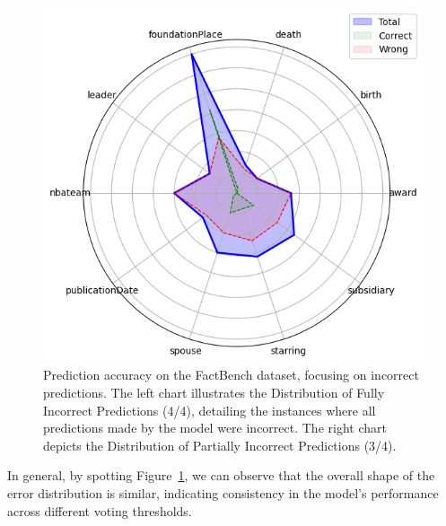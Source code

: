 \begin{figure}[ht!]
\begin{minipage}[b]{0.4\textwidth}
        \includegraphics[width=\textwidth]{res/radar-error-1}
    \end{minipage}
    \caption{Prediction accuracy on the FactBench dataset, focusing on incorrect predictions. The left chart illustrates the Distribution of Fully Incorrect Predictions (4/4), detailing the instances where all predictions made by the model were incorrect. The right chart depicts the Distribution of Partially Incorrect Predictions (3/4).}
    \label{fig:wrong_prediction_distribution}
\end{figure}

In general, by spotting Figure~\ref{fig:wrong_prediction_distribution}, we can observe that the overall shape of the error distribution is similar, indicating consistency in the model's performance across different voting thresholds.